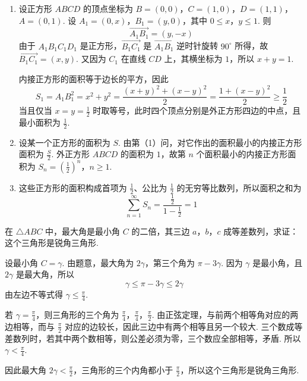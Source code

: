 \begin{solution}
\begin{enumerate}
\item 设正方形 \(ABCD\) 的顶点坐标为 \(B=(0,0)\)，\(C=(1,0)\)，\(D=(1,1)\)，\(A=(0,1)\). 设 \(A_1=(0,x)\)，\(B_1=(y,0)\)，其中 \(0\leqslant x\)，\(y\leqslant1\). 则
\[
\overrightarrow{A_1B_1}=(y,-x)
\]
由于 \(A_1B_1C_1D_1\) 是正方形，\(\overrightarrow{B_1C_1}\) 是 \(\overrightarrow{A_1B_1}\) 逆时针旋转 \(90^\circ\) 所得，故 \(\overrightarrow{B_1C_1}=(x,y)\). 又因为 \(C_1\) 在直线 \(CD\) 上，其横坐标为 \(1\)，所以 \(x+y=1\).

内接正方形的面积等于边长的平方，因此
\[
S_1=A_1B_1^2=x^2+y^2=\frac{(x+y)^2+(x-y)^2}{2}=\frac{1+(x-y)^2}{2}\geqslant\frac{1}{2}
\]
当且仅当 \(x=y=\frac{1}{2}\) 时取等号，此时四个顶点分别是外正方形四边的中点，且最小面积为 \(\frac{1}{2}\).

\item 设某一个正方形的面积为 \(S\). 由第（1）问，对它作出的面积最小的内接正方形面积为 \(\frac{S}{2}\). 外正方形 \(ABCD\) 的面积为 \(1\)，故第 \(n\) 个面积最小的内接正方形面积为
\(S_n=\left(\frac{1}{2}\right)^n\)，\(n\geqslant1\).

\item 这些正方形的面积构成首项为 \(\frac{1}{2}\)、公比为 \(\frac{1}{2}\) 的无穷等比数列，所以面积之和为
\[
\sum_{n=1}^{\infty}S_n=\frac{\frac{1}{2}}{1-\frac{1}{2}}=1
\]
\end{enumerate}
\end{solution}

\begin{problem}
在 \(\triangle ABC\) 中，最大角是最小角 \(C\) 的二倍，其三边 \(a\)，\(b\)，\(c\) 成等差数列，求证：这个三角形是锐角三角形.
\end{problem}

\begin{solution}
设最小角 \(C=\gamma\). 由题意，最大角为 \(2\gamma\)，第三个角为 \(\pi-3\gamma\). 因为 \(\gamma\) 是最小角，且 \(2\gamma\) 是最大角，所以
\[
\gamma\leqslant\pi-3\gamma\leqslant2\gamma
\]
由左边不等式得 \(\gamma\leqslant\frac{\pi}{4}\).

若 \(\gamma=\frac{\pi}{4}\)，则三角形的三个角为 \(\frac{\pi}{4}\)，\(\frac{\pi}{4}\)，\(\frac{\pi}{2}\). 由正弦定理，与前两个相等角对应的两边相等，而与 \(\frac{\pi}{2}\) 对应的边较长，因此三边中有两个相等且另一个较大. 三个数成等差数列时，若其中两个数相等，则公差必须为零，三个数应全部相等，矛盾. 所以 \(\gamma<\frac{\pi}{4}\).

因此最大角 \(2\gamma<\frac{\pi}{2}\)，三角形的三个内角都小于 \(\frac{\pi}{2}\)，所以这个三角形是锐角三角形.
\end{solution}
